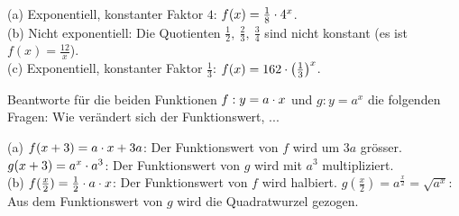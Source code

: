 \documentclass[11pt]{exam}
\begin{document}
\begin{questions}
{\begin{solution}
		(a) Exponentiell, konstanter Faktor $4$: $f(x)=\frac{1}{8}\cdot4^x$.\\
		(b) Nicht exponentiell: Die Quotienten $\frac{1}{2},\ \frac{2}{3},\ \frac{3}{4}$ sind nicht konstant (es ist $f(x)=\frac{12}{x}$).\\
		(c) Exponentiell, konstanter Faktor $\frac{1}{3}$: $f(x)=162\cdot\left(\frac{1}{3}\right)^x$.
\end{solution}}
{\antwort{7.5}}

\noaddpoints
\question[\totalpoints]
\addpoints
Beantworte für die beiden Funktionen $f:y=a\cdot x$ und $g:y=a^x$ die folgenden Fragen: Wie verändert sich der Funktionswert, ...
{\begin{solution}
		(a) $f(x+3)=a\cdot x+3a$: Der Funktionswert von $f$ wird um $3a$ grösser. $g(x+3)=a^x\cdot a^3$: Der Funktionswert von $g$ wird mit $a^3$ multipliziert.\\
		(b) $f(\frac{x}{2})=\frac{1}{2}\cdot a\cdot x$: Der Funktionswert von $f$ wird halbiert. $g(\frac{x}{2})=a^{\frac{x}{2}}=\sqrt{a^x}$: Aus dem Funktionswert von $g$ wird die Quadratwurzel gezogen.
\end{solution}}
{\antwort{8.5}}


\end{questions}
\end{document}

